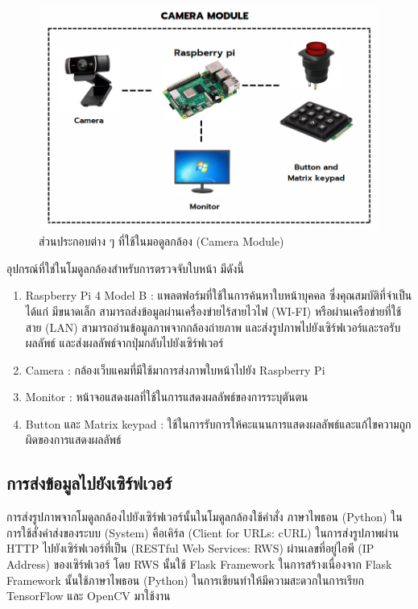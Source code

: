 \begin{figure}[ht!]
  \begin{center}
    \includegraphics[scale=.45]{pic/camera_module.png}
    \caption[ส่วนประกอบต่าง ๆ ที่ใช้ในมอดูลกล้อง (Camera Module)]{ส่วนประกอบต่าง ๆ ที่ใช้ในมอดูลกล้อง (Camera Module)}
    \label{fig:camera}
  \end{center}
\end{figure}
\newpage
อุปกรณ์ที่ใช่ในโมดูลกล้องสำหรับการตรวจจับใบหน้า มีดังนี้
\begin{enumerate}
  \item Raspberry Pi 4 Model B : แพลตฟอร์มที่ใช้ในการค้นหาใบหน้าบุคคล ซึ่งคุณสมบัติที่จำเป็นได้แก่ 
  มีขนาดเล็ก สามารถส่งข้อมูลผ่านเครื่องข่ายไร้สายไวไฟ (WI-FI) หรือผ่านเครือข่ายที่ใช้สาย (LAN) สามารถอ่านข้อมูลภาพจากกล้องถ่ายภาพ 
  และส่งรูปภาพไปยังเซิร์ฟเวอร์และรอรับผลลัพธ์ และส่งผลลัพธ์จากปุ่มกลับไปยังเซิร์ฟเวอร์
  \item Camera : กล้องเว็บแคมที่มีใช้มาการส่งภาพใบหน้าไปยัง Raspberry Pi
  \item Monitor : หน้าจอแสดงผลที่ใช้ในการแสดงผลลัพธ์ของการระบุตันตน
  \item Button และ Matrix keypad : ใช้ในการรับการให้คะแนนการแสดงผลลัพธ์และแก้ไขความถูกผิดของการแสดงผลลัพธ์
\end{enumerate}

\subsection{การส่งข้อมูลไปยังเซิร์ฟเวอร์}
การส่งรูปภาพจากโมดูลกล้องไปยังเซิร์ฟเวอร์นั้นในโมดูลกล้องใช้คำสั่ง ภาษาไพธอน (Python) ในการใช้สั่งคำส่งของระบบ (System)
คือเคิร์ล  (Client for URLs: cURL) ในการส่งรูปภาพผ่าน HTTP ไปยังเซิร์ฟเวอร์ที่เป็น (RESTful Web Services: RWS)
ผ่านเลขที่อยู่ไอพี (IP Address) ของเซิร์ฟเวอร์ โดย RWS นั้นใช้ Flask Framework 
ในการสร้างเนื่องจาก Flask Framework นั้นใช้ภาษาไพธอน (Python) ในการเขียนทำให้มีความสะดวกในการเรียก TensorFlow และ OpenCV มาใช้งาน

